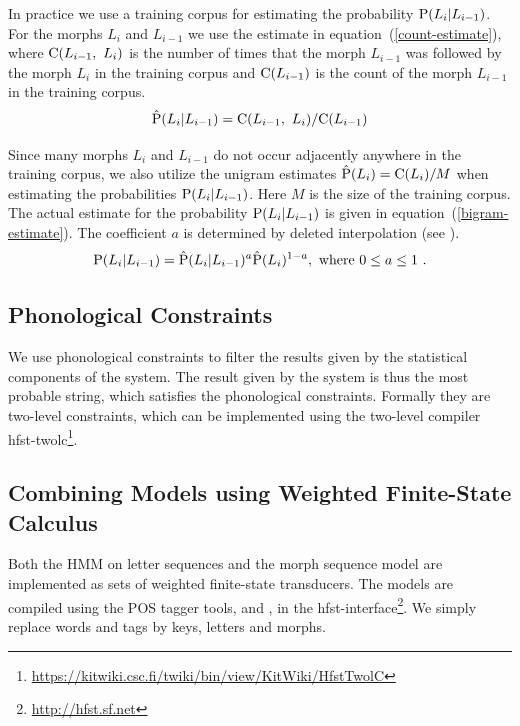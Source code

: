 \documentclass{llncs}
\begin{document}
In practice we use a training corpus for estimating the probability
${\rm P}(L_i | L_{i-1})$. For the morphs $L_i$ and $L_{i-1}$ we
use the estimate in equation~(\ref{count-estimate}), where ${\rm
  C}(L_{i-1},\ L_i)$ is the number of times that the morph $L_{i-1}$
was followed by the morph $L_i$ in the training corpus and ${\rm
  C}(L_{i-1})$ is the count of the morph $L_{i-1}$ in the training
corpus.
\begin{equation}\label{count-estimate}
{\rm \hat{P}}(L_i | L_{i-1}) = {\rm C}(L_{i - 1},\ L_i) / {\rm
  C}(L_{i-1})
\end{equation}

Since many morphs $L_i$ and $L_{i-1}$ do not occur adjacently anywhere
in the training corpus, we also utilize the unigram estimates ${\rm
  \hat{P}}(L_i) = {\rm C}(L_i)/M$ when estimating the probabilities
${\rm P}(L_i | L_{i-1})$. Here $M$ is the size of the training
corpus. The actual estimate for the probability ${\rm P}(L_i |
L_{i-1})$ is given in equation~(\ref{bigram-estimate}). The
coefficient $a$ is determined by deleted interpolation (see
\cite{Brants:2000}).
\begin{equation}\label{bigram-estimate}
{\rm P}(L_i | L_{i-1}) = {\rm \hat{P}}(L_i | L_{i-1})^a{\rm
  \hat{P}}(L_i)^{1 - a}{\rm,\ where }\ 0\leq a \leq 1\ {\rm.}
\end{equation}

\subsection{Phonological Constraints}

We use phonological constraints to filter the results given by the
statistical components of the system. The result given by the system
is thus the most probable string, which satisfies the phonological
constraints. Formally they are two-level constraints, which can be
implemented using the two-level compiler
hfst-twolc\footnote{\url{https://kitwiki.csc.fi/twiki/bin/view/KitWiki/HfstTwolC}}.

\subsection{Combining Models using Weighted Finite-State Calculus}

Both the HMM on letter sequences and the morph sequence model are
implemented as sets of weighted finite-state transducers. The models
are compiled using the POS tagger tools,
\cite{Silfverberg/2010/IceTal} and \cite{Silfverberg/2011}, in the
hfst-interface\footnote{\url{http://hfst.sf.net}}. We simply replace
words and tags by keys, letters and morphs.
\end{document}
